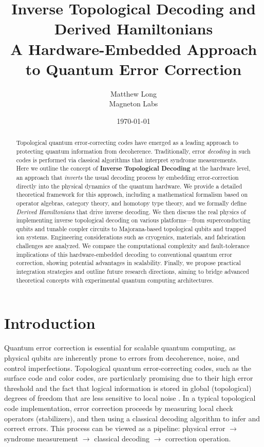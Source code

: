 \documentclass[11pt]{article}
\begin{document}
\title{Inverse Topological Decoding and Derived Hamiltonians \\  A Hardware-Embedded Approach to Quantum Error Correction}
\author{Matthew Long \\
Magneton Labs}
\date{\today}

\maketitle

\begin{abstract}
Topological quantum error-correcting codes have emerged as a leading approach to protecting quantum information from decoherence. Traditionally, error \emph{decoding} in such codes is performed via classical algorithms that interpret syndrome measurements. Here we outline the concept of \textbf{Inverse Topological Decoding} at the hardware level, an approach that \emph{inverts} the usual decoding process by embedding error-correction directly into the physical dynamics of the quantum hardware. We provide a detailed theoretical framework for this approach, including a mathematical formalism based on operator algebras, category theory, and homotopy type theory, and we formally define \emph{Derived Hamiltonians} that drive inverse decoding. We then discuss the real physics of implementing inverse topological decoding on various platforms---from superconducting qubits and tunable coupler circuits to Majorana-based topological qubits and trapped ion systems. Engineering considerations such as cryogenics, materials, and fabrication challenges are analyzed. We compare the computational complexity and fault-tolerance implications of this hardware-embedded decoding to conventional quantum error correction, showing potential advantages in scalability. Finally, we propose practical integration strategies and outline future research directions, aiming to bridge advanced theoretical concepts with experimental quantum computing architectures.
\end{abstract}

\section{Introduction}
Quantum error correction is essential for scalable quantum computing, as physical qubits are inherently prone to errors from decoherence, noise, and control imperfections. Topological quantum error-correcting codes, such as the surface code and color codes, are particularly promising due to their high error threshold and the fact that logical information is stored in global (topological) degrees of freedom that are less sensitive to local noise \cite{Dennis2002, Fowler2012}. In a typical topological code implementation, error correction proceeds by measuring local check operators (stabilizers), and then using a classical decoding algorithm to infer and correct errors. This process can be viewed as a pipeline: physical error $\to$ syndrome measurement $\to$ classical decoding $\to$ correction operation. 
\end{document}
